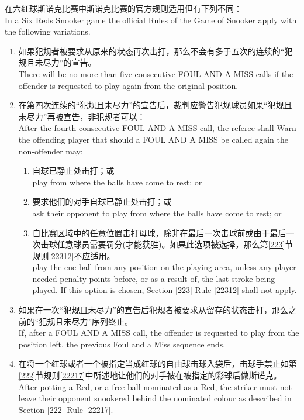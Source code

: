 \noindent 在六红球斯诺克比赛中斯诺克比赛的官方规则适用但有下列不同：\\
In a Six Reds Snooker game the official Rules of the Game of 
Snooker apply with the following variations.
\begin{enumerate}[label=(\alph*)]
    \item 如果犯规者被要求从原来的状态再次击打，那么不会有多于五次的连续的``犯规且未尽力''的宣告。\\
    There will be no more than five consecutive FOUL AND A MISS calls if the offender is requested to play again from the original position.
    \item 在第四次连续的``犯规且未尽力''的宣告后，裁判应警告犯规球员如果``犯规且未尽力''再被宣告，非犯规者可以：\\
    After the fourth consecutive FOUL AND A MISS call, the referee shall Warn the offending player that should a FOUL AND A MISS be called again the non-offender may:
    \begin{enumerate}[label=(\roman*)]
        \item 自球已静止处击打；或\\
        play from where the balls have come to rest; or
        \item 要求他们的对手自球已静止处击打；或\\
        ask their opponent to play from where the balls have come to rest; or
        \item 自比赛区域中的任意位置击打母球，除非在最后一次击球前或由于最后一次击球任意球员需要罚分(才能获胜)。如果此选项被选择，那么第\ref{223}节规则\ref{22312}不应适用。\\
        play the cue-ball from any position on the playing area, unless any player needed penalty points before, or as a result of, the last stroke being played. If this option is chosen, Section \ref{223} Rule \ref{22312} shall not apply.
    \end{enumerate}
    \item 如果在一次``犯规且未尽力''的宣告后犯规者被要求从留存的状态击打，那么之前的``犯规且未尽力''序列终止。\\
    If, after a FOUL AND A MISS call, the offender is requested to play from the position left, the previous Foul and a Miss sequence ends.
    \item 在将一个红球或者一个被指定当成红球的自由球击球入袋后，击球手禁止如第\ref{222}节规则\ref{22217}中所述地让他们的对手被在被指定的彩球后做斯诺克。\\
    After potting a Red, or a free ball nominated as a Red, the striker must not leave their opponent snookered behind the nominated colour as described in Section \ref{222} Rule \ref{22217}.
\end{enumerate}

